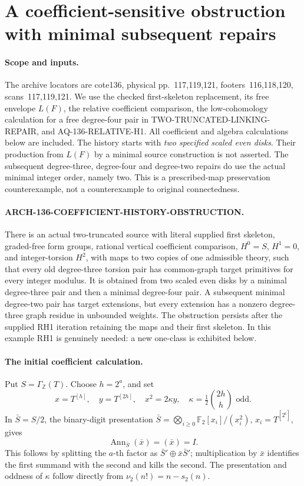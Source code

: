 \section{A coefficient-sensitive obstruction with minimal subsequent repairs}
\label{sec:136-coefficient-history-obstruction}

\paragraph{Scope and inputs.}
The archive locators are cote136, physical pp.~117,119,121,
footers~116,118,120, scans~117,119,121.  We use the checked
first-skeleton replacement, its free envelope $L(F)$, the
relative coefficient comparison, the low-cohomology calculation
for a free degree-four pair in TWO-TRUNCATED-LINKING-REPAIR,
and AQ-136-RELATIVE-H1.  All coefficient and algebra
calculations below are included.  The history starts with
\emph{two specified scaled even disks}.  Their production
from $L(F)$ by a minimal source construction is not asserted.
The subsequent degree-three, degree-four and degree-two
repairs do use the actual minimal integer order, namely two.
This is a prescribed-map preservation counterexample, not
a counterexample to original connectedness.

\paragraph{ARCH-136-COEFFICIENT-HISTORY-OBSTRUCTION.}
There is an actual two-truncated source with literal supplied
first skeleton, graded-free form groups, rational vertical
coefficient comparison, $H^0=S$, $H^1=0$, and integer-torsion
$H^2$, with maps to two copies of one admissible theory,
such that every old degree-three torsion pair has common-graph
target primitives for every integer modulus.  It is obtained
from two scaled even disks by a minimal degree-three pair
and then a minimal degree-four pair.  A subsequent minimal
degree-two pair has target extensions, but every extension
has a nonzero degree-three graph residue in unbounded weights.
The obstruction persists after the supplied RH1 iteration
retaining the maps and their first skeleton.  In this example
RH1 is genuinely needed: a new one-class is exhibited below.

\paragraph{The initial coefficient calculation.}
Put $S=\Gamma_{\mathbb Z}(T)$.  Choose $h=2^a$, and set
\[
 x=T^{[h]},\quad y=T^{[2h]},\quad
 x^2=2\kappa y,\quad \kappa=\tfrac12\binom{2h}{h}\text{ odd}.
 \tag{136.CH1}
\]
In $\bar S=S/2$, the binary-digit presentation
$\bar S=\bigotimes_{i\ge0}\mathbb F_2[x_i]/(x_i^2)$,
$x_i=T^{[2^i]}$, gives
\[
                 \operatorname{Ann}_{\bar S}(\bar x)=(\bar x)=I.
 \tag{136.CH2}
\]
This follows by splitting the $a$-th factor as
$\bar S'\oplus\bar x\bar S'$; multiplication by $\bar x$
identifies the first summand with the second and kills the
second.  The presentation and oddness of $\kappa$ follow
directly from $\nu_2(n!)=n-s_2(n)$.

